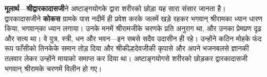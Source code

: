 \begin{sloppypar}\justifying{}
\textbf{मूलार्थ}—\textbf{श्रीद्वारकादासजी}ने अष्टाङ्गयोगके द्वारा शरीरको छोड़ा यह सारा संसार जानता है। द्वारकादासजीने \textbf{कोकस} ग्रामके पास नदीमें ही प्रवेश करके जलमें खड़े रहकर भगवान् श्रीरामका ध्यान धारण किया, भगवान्‌का ध्यान लगाया। उनके मनमें श्रीरामजीके चरणके प्रति अनुराग था, और उनका प्रेमप्रण दृढ़ और सत्य था। वे पुत्र, स्त्री, धन और भवन—इन सबसे सदैव उदासीन ही रहे। उन्होंने कठिन मोहके फंद रूप फाँसीको तिनकेके समान तोड़ दिया और श्रीकील्हदेवजीकी कृपासे और अपने भजनबलसे ज्ञानकी तलवार लेकर उन्होंने मायाको समाप्त कर दिया था। अष्टाङ्गयोगसे शरीरको छोड़कर द्वारकादासजी भगवान् श्रीरामके चरणमें विलीन हो गए।
\end{sloppypar}


